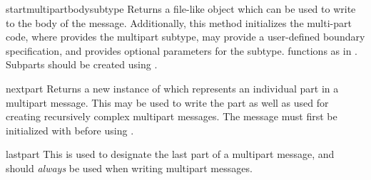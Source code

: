 \begin{methoddesc}{startmultipartbody}{subtype}
Returns a file-like object which can be used to write to the
body of the message.  Additionally, this method initializes the
multi-part code, where  provides the multipart subtype,
 may provide a user-defined boundary specification, and
 provides optional parameters for the subtype.
 functions as in .  Subparts should be
created using .
\end{methoddesc}

\begin{methoddesc}{nextpart}{}
Returns a new instance of  which represents an
individual part in a multipart message.  This may be used to write the 
part as well as used for creating recursively complex multipart
messages. The message must first be initialized with
 before using .
\end{methoddesc}

\begin{methoddesc}{lastpart}{}
This is used to designate the last part of a multipart message, and
should \emph{always} be used when writing multipart messages.
\end{methoddesc}
